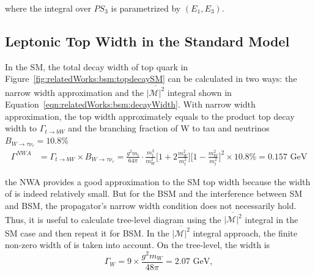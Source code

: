 \noindent where the integral over $PS_3$ is parametrized by $ ( E_1,E_3 )$.



\subsection{Leptonic Top Width in the Standard Model}
\label{sec:relatedWorks:bsm:smTopDecay}

In the SM, the total decay width of top quark in Figure~\ref{fig:relatedWorks:bsm:topdecaySM} can be calculated in two ways: the narrow width approximation and the $\overline{ |\mathcal{M}|^2 } $ integral shown in Equation~\ref{eqn:relatedWorks:bsm:decayWidth}. With narrow width approximation, the top width approximately equals to the product top decay width to \PW $\Gamma_{t\to b W}$ and the branching fraction of W to tau and neutrinos $B_{W\to \tau \nu_\tau} = 10.8\%$
\begin{equation}
\begin{split}
    \Gamma^{NWA} &= \Gamma_{t\to b W} \times B_{W\to \tau \nu_\tau} = \frac{g^2 m_t }{64\pi} \cdot \frac{m_t^2}{m_W^2} \bigg[ 1+2 \frac{m_W^2}{m_t^2}\bigg] \bigg[1-\frac{m_W^2}{m_t^2} \bigg]^2 \times 10.8\%  = 0.157 \text{ GeV}
\end{split}
\label{eqn:relatedWorks:bsm:nwa}
\end{equation}

\noindent the NWA provides a good approximation to the SM top width because the width of \PW is indeed relatively small. But for the BSM and the interference between SM and BSM, the propagator's narrow width condition does not necessarily hold. Thus, it is useful to calculate tree-level diagram using the $\overline{ |\mathcal{M}|^2 } $ integral in the SM case and then repeat it for BSM. In the $\overline{ |\mathcal{M}|^2 } $ integral approach, the finite non-zero width of \PW is taken into account. On the tree-level, the \PW width is
\begin{equation}
	\Gamma_W = 9 \times \frac{g^2 m_W}{48 \pi} = 2.07 \text{ GeV},
    \label{eqn:relatedWorks:bsm:wWidth}
\end{equation}

